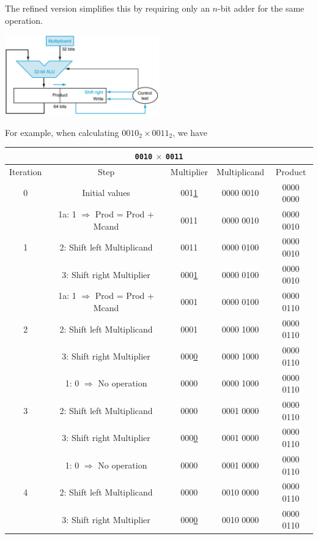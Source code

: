 The refined version simplifies this by requiring only an \(n\)-bit adder for the same operation.
\begin{center}
  \includegraphics[width=0.5\textwidth]{Figure/mul_2.png}
\end{center}

For example, when calculating \(0010_2 \times 0011_2\), we have
\begin{table}[H]
\centering
\begin{tabular}{c|c|c|c|c}
    \hline
    \multicolumn{5}{c}{\texttt{0010} \(\times\) \texttt{0011}} \\ \hline
    Iteration & Step & Multiplier & Multiplicand & Product \\ \hline
    0 & Initial values & 001\underline{1} & 0000 0010 & 0000 0000 \\ \hline
    \multirow{3}{*}{1} & 1a: 1 \(\Rightarrow\) Prod = Prod + Mcand & 0011 & 0000 0010 & 0000 0010 \\ \cline{2-5}
      & 2: Shift left Multiplicand & 0011 & 0000 0100 & 0000 0010 \\ \cline{2-5}
      & 3: Shift right Multiplier  & 000\underline{1} & 0000 0100 & 0000 0010 \\ \hline
    \multirow{3}{*}{2} & 1a: 1 \(\Rightarrow\) Prod = Prod + Mcand & 0001 & 0000 0100 & 0000 0110 \\ \cline{2-5}
      & 2: Shift left Multiplicand & 0001 & 0000 1000 & 0000 0110 \\ \cline{2-5}
      & 3: Shift right Multiplier  & 000\underline{0} & 0000 1000 & 0000 0110 \\ \hline
    \multirow{3}{*}{3} & 1: 0 \(\Rightarrow\) No operation & 0000 & 0000 1000 & 0000 0110 \\ \cline{2-5}
      & 2: Shift left Multiplicand & 0000 & 0001 0000 & 0000 0110 \\ \cline{2-5}
      & 3: Shift right Multiplier  & 000\underline{0} & 0001 0000 & 0000 0110 \\ \hline
    \multirow{3}{*}{4} & 1: 0 \(\Rightarrow\) No operation & 0000 & 0001 0000 & 0000 0110 \\ \cline{2-5}
      & 2: Shift left Multiplicand & 0000 & 0010 0000 & 0000 0110 \\ \cline{2-5}
      & 3: Shift right Multiplier  & 000\underline{0} & 0010 0000 & 0000 0110 \\ \hline
\end{tabular}
\end{table}

